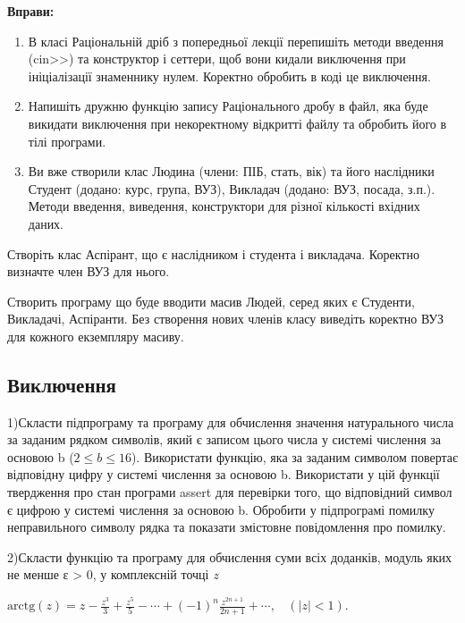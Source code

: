 \documentclass[]{article}
\begin{document}
\textbf{Вправи:}

\begin{enumerate}
\def\labelenumi{\arabic{enumi})}
\item
  В класі Раціональній дріб з попередньої лекції перепишіть методи
  введення (cin\textgreater{}\textgreater{}) та конструктор і сеттери,
  щоб вони кидали виключення при ініціалізації знаменнику нулем.
  Коректно обробить в коді це виключення.
\item
  Напишіть дружню функцію запису Раціонального дробу в файл, яка буде
  викидати виключення при некоректному відкритті файлу та обробить його
  в тілі програми.
\item
  Ви вже створили клас Людина (члени: ПІБ, стать, вік) та його
  наслідники Студент (додано: курс, група, ВУЗ), Викладач (додано: ВУЗ,
  посада, з.п.). Методи введення, виведення, конструктори для різної
  кількості вхідних даних.
\end{enumerate}

Створіть клас Аспірант, що є наслідником і студента і викладача.
Коректно визначте член ВУЗ для нього.

Створить програму що буде вводити масив Людей, серед яких є Студенти,
Викладачі, Аспіранти. Без створення нових членів класу виведіть коректно
ВУЗ для кожного екземпляру масиву.

\subsection{Виключення}\label{ux432ux438ux43aux43bux44eux447ux435ux43dux43dux44f}

1)Скласти підпрограму та програму для обчислення значення натурального
числа за заданим рядком символів, який є записом цього числа у системі
числення за основою b (\(2 \leq b \leq 16\)). Використати функцію, яка
за заданим символом повертає відповідну цифру у системі числення за
основою b. Використати у цій функції твердження про стан програми assert
для перевірки того, що відповідний символ є цифрою у системі числення за
основою b. Обробити у підпрограмі помилку неправильного символу рядка та
показати змістовне повідомлення про помилку.

2)Скласти функцію та програму для обчислення суми всіх доданків, модуль
яких не менше ε \textgreater{} 0, у комплексній точці \emph{z}

\(\text{arctg}\left( z \right) = z - \frac{z^{3}}{3} + \frac{z^{5}}{5} - \cdots + {( - 1)}^{n}\frac{z^{2n + 1}}{2n + 1} + \cdots,\ \ \ \ (\left| z \right| < 1)\).
\end{document}
